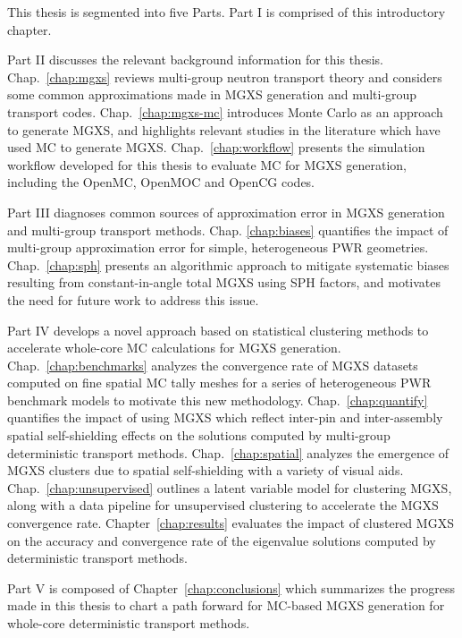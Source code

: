 This thesis is segmented into five Parts. Part I is comprised of this introductory chapter.

Part II discusses the relevant background information for this thesis. Chap.~\ref{chap:mgxs} reviews multi-group neutron transport theory and considers some common approximations made in \ac{MGXS} generation and multi-group transport codes. Chap.~\ref{chap:mgxs-mc} introduces Monte Carlo as an approach to generate \ac{MGXS}, and highlights relevant studies in the literature which have used \ac{MC} to generate \ac{MGXS}. Chap.~\ref{chap:workflow} presents the simulation workflow developed for this thesis to evaluate \ac{MC} for \ac{MGXS} generation, including the OpenMC, OpenMOC and OpenCG codes.

Part III diagnoses common sources of approximation error in \ac{MGXS} generation and multi-group transport methods. Chap. \ref{chap:biases} quantifies the impact of multi-group approximation error for simple, heterogeneous \ac{PWR} geometries. Chap.~\ref{chap:sph} presents an algorithmic approach to mitigate systematic biases resulting from constant-in-angle total \ac{MGXS} using \ac{SPH} factors, and motivates the need for future work to address this issue.

Part IV develops a novel approach based on statistical clustering methods to accelerate whole-core \ac{MC} calculations for \ac{MGXS} generation. Chap.~\ref{chap:benchmarks} analyzes the convergence rate of \ac{MGXS} datasets computed on fine spatial \ac{MC} tally meshes for a series of heterogeneous \ac{PWR} benchmark models to motivate this new methodology. Chap.~\ref{chap:quantify} quantifies the impact of using \ac{MGXS} which reflect inter-pin and inter-assembly spatial self-shielding effects on the solutions computed by multi-group deterministic transport methods. Chap.~\ref{chap:spatial} analyzes the emergence of \ac{MGXS} clusters due to spatial self-shielding with a variety of visual aids. Chap.~\ref{chap:unsupervised} outlines a latent variable model for clustering \ac{MGXS}, along with a data pipeline for unsupervised clustering to accelerate the \ac{MGXS} convergence rate. Chapter~\ref{chap:results} evaluates the impact of clustered \ac{MGXS} on the accuracy and convergence rate of the eigenvalue solutions computed by deterministic transport methods.

Part V is composed of Chapter~\ref{chap:conclusions} which summarizes the progress made in this thesis to chart a path forward for \ac{MC}-based \ac{MGXS} generation for whole-core deterministic transport methods.


